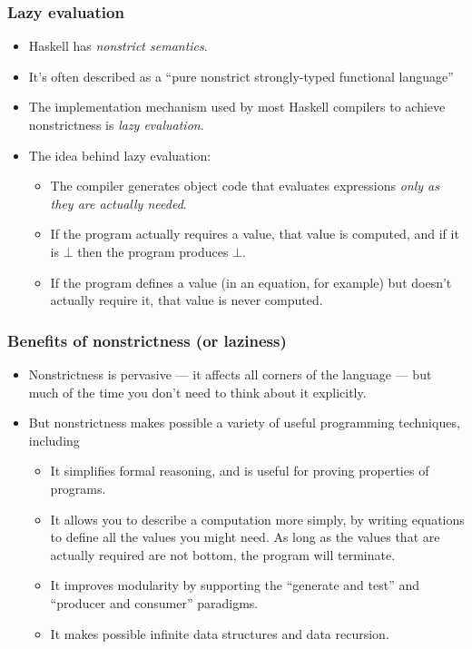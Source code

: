 \documentclass{beamer}
\begin{document}
\begin{frame}[fragile]
\frametitle{Lazy evaluation}

\begin{itemize}
\item Haskell has \emph{nonstrict semantics}.
\item It's often described as a ``pure nonstrict strongly-typed
  functional language''
\item The implementation mechanism used by most Haskell compilers
  to achieve nonstrictness is \emph{lazy evaluation}.
\item The idea behind lazy evaluation:
  \begin{itemize}
  \item The compiler generates object code that evaluates
    expressions \emph{only as they are actually needed}.
  \item If the program actually requires a value, that value is
    computed, and if it is $\bot$ then the program produces $\bot$.
  \item If the program defines a value (in an equation, for
    example) but doesn't actually require it, that value is never
    computed.
  \end{itemize}
\end{itemize}

\end{frame}

\begin{frame}[fragile]
\frametitle{Benefits of nonstrictness (or laziness)}

\begin{itemize}
\item Nonstrictness is pervasive --- it affects all corners of the
  language --- but much of the time you don't need to think about
  it explicitly.
\item But nonstrictness makes possible a variety of useful
  programming techniques, including
  \begin{itemize}
  \item It simplifies formal reasoning, and is useful for proving
    properties of programs.
  \item It allows you to describe a computation more simply, by
    writing equations to define all the values you might need.  As
    long as the values that are actually required are not bottom,
    the program will terminate.
  \item It improves modularity by supporting the ``generate and
    test'' and ``producer and consumer'' paradigms.
  \item It makes possible infinite data structures and data recursion.
  \end{itemize}
\end{itemize}

\end{frame}
\end{document}
